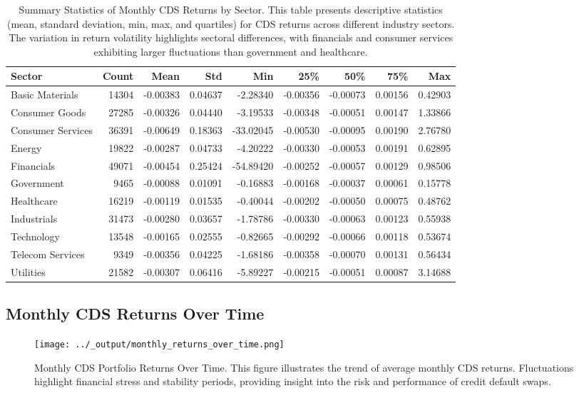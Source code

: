 \documentclass{article}
\begin{document}
\begin{table}[h]
\centering
\begin{tabular}{lrrrrrrrr}
\toprule
Sector & Count & Mean & Std & Min & 25\% & 50\% & 75\% & Max \\
\midrule
Basic Materials & 14304 & -0.00383 & 0.04637 & -2.28340 & -0.00356 & -0.00073 & 0.00156 & 0.42903 \\
Consumer Goods & 27285 & -0.00326 & 0.04440 & -3.19533 & -0.00348 & -0.00051 & 0.00147 & 1.33866 \\
Consumer Services & 36391 & -0.00649 & 0.18363 & -33.02045 & -0.00530 & -0.00095 & 0.00190 & 2.76780 \\
Energy & 19822 & -0.00287 & 0.04733 & -4.20222 & -0.00330 & -0.00053 & 0.00191 & 0.62895 \\
Financials & 49071 & -0.00454 & 0.25424 & -54.89420 & -0.00252 & -0.00057 & 0.00129 & 0.98506 \\
Government & 9465 & -0.00088 & 0.01091 & -0.16883 & -0.00168 & -0.00037 & 0.00061 & 0.15778 \\
Healthcare & 16219 & -0.00119 & 0.01535 & -0.40044 & -0.00202 & -0.00050 & 0.00075 & 0.48762 \\
Industrials & 31473 & -0.00280 & 0.03657 & -1.78786 & -0.00330 & -0.00063 & 0.00123 & 0.55938 \\
Technology & 13548 & -0.00165 & 0.02555 & -0.82665 & -0.00292 & -0.00066 & 0.00118 & 0.53674 \\
Telecom Services & 9349 & -0.00356 & 0.04225 & -1.68186 & -0.00358 & -0.00070 & 0.00131 & 0.56434 \\
Utilities & 21582 & -0.00307 & 0.06416 & -5.89227 & -0.00215 & -0.00051 & 0.00087 & 3.14688 \\
\bottomrule
\end{tabular}
\caption{\label{tab:sector_cds_stats} Summary Statistics of Monthly CDS Returns by Sector. 
This table presents descriptive statistics (mean, standard deviation, min, max, and quartiles) 
for CDS returns across different industry sectors. The variation in return volatility highlights sectoral differences, 
with financials and consumer services exhibiting larger fluctuations than government and healthcare.}
\end{table}

\subsection{Monthly CDS Returns Over Time}
\begin{figure}[h]
    \centering
    \texttt{[image: ../\_output/monthly\_returns\_over\_time.png]}  %
    \caption{\label{fig:monthly_cds_returns} Monthly CDS Portfolio Returns Over Time. 
This figure illustrates the trend of average monthly CDS returns. 
Fluctuations highlight financial stress and stability periods, providing insight into the risk and performance of credit default swaps.}
\end{figure}
\end{document}
